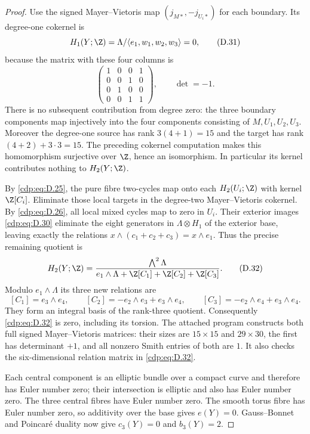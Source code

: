 \begin{proof}
Use the signed Mayer--Vietoris map
$(j_{M*},-j_{U_i*})$ for each boundary. Its degree-one
cokernel is
\[
 H_1(Y;\Z)=
 \Lambda/\langle e_1,w_1,w_2,w_3\rangle=0,
\tag{D.31}\label{cdp:eq:D.31}
\]
because the matrix with these four columns is
\[
 \begin{pmatrix}
 1&0&0&1\\0&0&1&0\\0&1&0&0\\0&0&1&1
 \end{pmatrix},\qquad\det=-1.
\]
There is no subsequent contribution from degree zero:
the three boundary components map injectively into the
four components consisting of $M,U_1,U_2,U_3$.
Moreover the degree-one source has rank $3(4+1)=15$
and the target has rank $(4+2)+3\cdot3=15$.
The preceding cokernel computation makes this homomorphism
surjective over $\Z$, hence an isomorphism. In particular
its kernel contributes nothing to $H_2(Y;\Z)$.

By \eqref{cdp:eq:D.25}, the pure fibre two-cycles map onto each
$H_2(U_i;\Z)$ with kernel $\Z[C_i]$. Eliminate those
local targets in the degree-two Mayer--Vietoris cokernel.
By \eqref{cdp:eq:D.26}, all local mixed cycles map to zero in $U_i$.
Their exterior images \eqref{cdp:eq:D.30} eliminate the eight
generators in $\Lambda\otimes H_1$ of the exterior base,
leaving exactly the relations
$x\wedge(c_1+c_2+c_3)=x\wedge e_1$. Thus the precise
remaining quotient is
\[
 H_2(Y;\Z)=
 \frac{\bigwedge^2\Lambda}
 {e_1\wedge\Lambda+\Z[C_1]+\Z[C_2]+\Z[C_3]}.
\tag{D.32}\label{cdp:eq:D.32}
\]
Modulo $e_1\wedge\Lambda$ its three new relations are
\[
 [C_1]=e_3\wedge e_4,\qquad
 [C_2]=-e_2\wedge e_3+e_3\wedge e_4,\qquad
 [C_3]=-e_2\wedge e_4+e_3\wedge e_4.
\]
They form an integral basis of the rank-three quotient.
Consequently \eqref{cdp:eq:D.32} is zero, including its torsion.
The attached program constructs both full signed
Mayer--Vietoris matrices: their sizes are $15\times15$
and $29\times30$, the first has determinant $+1$, and
all nonzero Smith entries of both are $1$. It also checks
the six-dimensional relation matrix in \eqref{cdp:eq:D.32}.

Each central component is an elliptic bundle over a
compact curve and therefore has Euler number zero; their
intersection is elliptic and also has Euler number zero.
The three central fibres have Euler number zero. The
smooth torus fibre has Euler number zero, so additivity
over the base gives $e(Y)=0$. Gauss--Bonnet and Poincar\'e
duality now give $c_3(Y)=0$ and $b_3(Y)=2$.


\end{proof}
